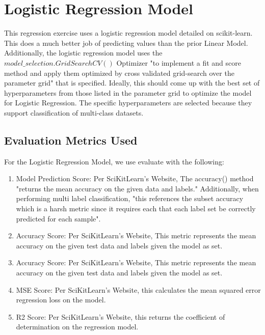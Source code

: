 \documentclass[titlepage]{article}
\begin{document}
\section*{Logistic Regression Model}
This regression exercise uses a logistic regression model detailed on scikit-learn.  This does a much better job of predicting values than the prior Linear Model. Additionally, the logistic regression model uses the $model\_selection.GridSearchCV()$ Optimizer  "to implement a fit and score method and apply them optimized by cross validated grid-search over the parameter grid" that is specified. Ideally, this should come up with the best set of hyperparameters from those listed in the parameter grid to optimize the model for Logistic Regression. The specific hyperparameters are selected because they support classification of multi-class datasets.

	\subsection*{Evaluation Metrics Used}
	For the Logistic Regression Model, we use evaluate with the following:  
	\begin{enumerate}
		\item Model Prediction Score: Per SciKitLearn's Website\cite{scikitlearn}, The accuracy() method "returns the mean accuracy on the given data and labels." Additionally, when performing multi label classification, "this references the subset accuracy which is a harsh metric since it requires each that each label set be correctly predicted for each sample".
		\item Accuracy Score: Per SciKitLearn's Website\cite{scikitlearn}, This metric represents the mean accuracy on the given test data and labels given the model as set.
		\item Accuracy Score: Per SciKitLearn's Website\cite{scikitlearn}, This metric represents the mean accuracy on the given test data and labels given the model as set.
		\item MSE Score: Per SciKitLearn's Website\cite{scikitlearn}, this calculates the mean squared error regression loss on the model.
		\item R2 Score: Per SciKitLearn's Website\cite{scikitlearn}, this returns the coefficient of determination on the regression model.
		
	\end{enumerate} 
	
\end{document}
